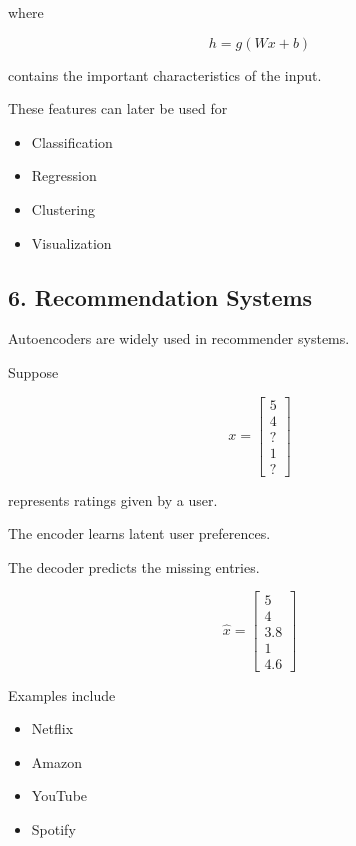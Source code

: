 \documentclass{article}
\begin{document}
	where
	
	\[
	h=
	g(Wx+b)
	\]
	
	contains the important characteristics of the input.
	
	These features can later be used for
	
	\begin{itemize}
		\item Classification
		\item Regression
		\item Clustering
		\item Visualization
	\end{itemize}
	
	\subsection{6. Recommendation Systems}
	
	Autoencoders are widely used in recommender systems.
	
	Suppose
	
	\[
	x=
	\begin{bmatrix}
		5\\
		4\\
		?\\
		1\\
		?
	\end{bmatrix}
	\]
	
	represents ratings given by a user.
	
	The encoder learns latent user preferences.
	
	The decoder predicts the missing entries.
	
	\[
	\hat{x}
	=
	\begin{bmatrix}
		5\\
		4\\
		3.8\\
		1\\
		4.6
	\end{bmatrix}
	\]
	
	Examples include
	
	\begin{itemize}
		\item Netflix
		\item Amazon
		\item YouTube
		\item Spotify
	\end{itemize}
	
\end{document}
